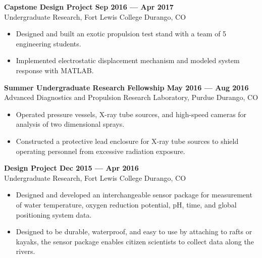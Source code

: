 \noindent \textbf{Capstone Design Project \hfill Sep 2016 --- Apr 2017}\\
Undergraduate Research, Fort Lewis College \dotfill Durango, CO

\begin{itemize}
    \item Designed and built an exotic propulsion test stand with a team of 5 engineering students.
    \item Implemented electrostatic displacement mechanism and modeled system response with MATLAB.
\end{itemize}

\noindent \textbf{Summer Undergraduate Research Fellowship \hfill May 2016 --- Aug 2016}\\
Advanced Diagnostics and Propulsion Research Laboratory, Purdue \dotfill Durango, CO

\begin{itemize}
    \item Operated pressure vessels, X-ray tube sources, and high-speed cameras for analysis of two dimensional sprays.
    \item Constructed a protective lead enclosure for X-ray tube sources to shield operating personnel from excessive radiation exposure.
\end{itemize}

\noindent \textbf{Design Project \hfill Dec 2015 --- Apr 2016}\\
Undergraduate Research, Fort Lewis College \dotfill Durango, CO

\begin{itemize}
    \item Designed and developed an interchangeable sensor package for measurement of water temperature, oxygen reduction potential, pH, time, and global positioning system data.
    \item Designed to be durable, waterproof, and easy to use by attaching to rafts or kayaks, the sensor package enables citizen scientists to collect data along the rivers.
\end{itemize}
